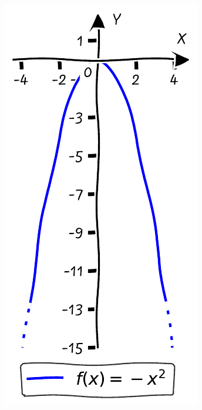 \documentclass{tufte-handout}
\begin{document}
\begin{figure}[h]
\begin{minipage}{0.19\textwidth}
    \label{fig:second}
  \end{minipage}\hfill
  \begin{minipage}{0.19\textwidth}
    \includegraphics[width=\linewidth]{./graphs/quadratic_func_flipped.pdf}

\end{minipage}
\end{figure}
\end{document}
